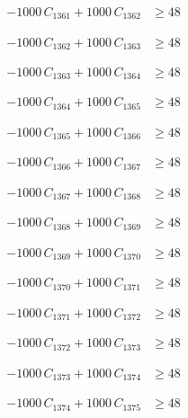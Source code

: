 \documentclass[a4paper,11pt]{article}
\begin{document}
\begin{align}
-1000\,C_{1361} + 1000\,C_{1362} &\geq 48 \nonumber
\end{align}

\begin{align}
-1000\,C_{1362} + 1000\,C_{1363} &\geq 48 \nonumber
\end{align}

\begin{align}
-1000\,C_{1363} + 1000\,C_{1364} &\geq 48 \nonumber
\end{align}

\begin{align}
-1000\,C_{1364} + 1000\,C_{1365} &\geq 48 \nonumber
\end{align}

\begin{align}
-1000\,C_{1365} + 1000\,C_{1366} &\geq 48 \nonumber
\end{align}

\begin{align}
-1000\,C_{1366} + 1000\,C_{1367} &\geq 48 \nonumber
\end{align}

\begin{align}
-1000\,C_{1367} + 1000\,C_{1368} &\geq 48 \nonumber
\end{align}

\begin{align}
-1000\,C_{1368} + 1000\,C_{1369} &\geq 48 \nonumber
\end{align}

\begin{align}
-1000\,C_{1369} + 1000\,C_{1370} &\geq 48 \nonumber
\end{align}

\begin{align}
-1000\,C_{1370} + 1000\,C_{1371} &\geq 48 \nonumber
\end{align}

\begin{align}
-1000\,C_{1371} + 1000\,C_{1372} &\geq 48 \nonumber
\end{align}

\begin{align}
-1000\,C_{1372} + 1000\,C_{1373} &\geq 48 \nonumber
\end{align}

\begin{align}
-1000\,C_{1373} + 1000\,C_{1374} &\geq 48 \nonumber
\end{align}

\begin{align}
-1000\,C_{1374} + 1000\,C_{1375} &\geq 48 \nonumber
\end{align}
\end{document}
